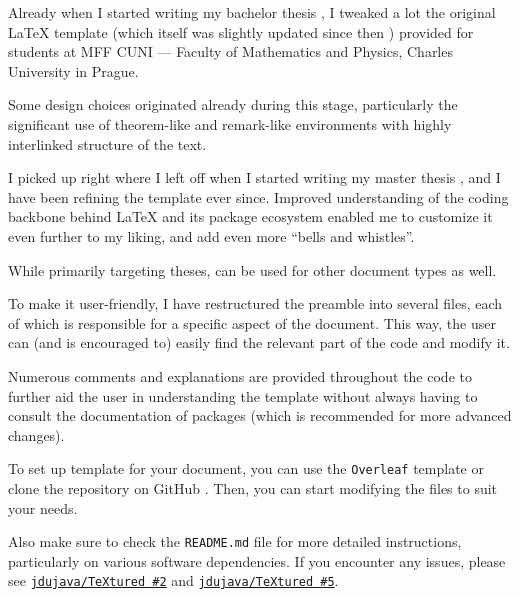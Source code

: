  \label{ch:Introduction}

Already when I started writing my bachelor thesis \autocite{Dujava2022}, I tweaked a lot the original \LaTeX{} template (which itself was slightly updated since then \autocite{MaresTemplate}) provided for students at MFF CUNI --- Faculty of Mathematics and Physics, Charles University in Prague.

Some design choices originated already during this stage, particularly the significant use of theorem-like and remark-like environments with highly interlinked structure of the text.

I picked up right where I left off when I started writing my master thesis \autocite{Dujava2025}, and I have been refining the template ever since.
Improved understanding of the coding backbone behind \LaTeX{} and its package ecosystem enabled me to customize it even further to my liking, and add even more \enquote{bells and whistles}.

\begin{remark}
    While primarily targeting theses, \TeXtured{} can be used for other document types as well.
\end{remark}

To make it user-friendly, I have restructured the preamble into several files, each of which is responsible for a specific aspect of the document.
This way, the user can (and is encouraged to) easily find the relevant part of the code and modify it.

Numerous comments and explanations are provided throughout the code to further aid the user in understanding the template without always having to consult the documentation of packages (which is recommended for more advanced changes).

\begin{remark}
    To set up \TeXtured{} template for your document, you can use the \texttt{Overleaf} template or clone the repository on \textsf{GitHub} \autocite{TeXtured}.
    Then, you can start modifying the files to suit your needs.

    Also make sure to check the \texttt{README.md} file for more detailed instructions, particularly on various software dependencies.
    If you encounter any issues, please see \href{https://github.com/jdujava/TeXtured/issues/2}{\texttt{jdujava/TeXtured \#2}} and \href{https://github.com/jdujava/TeXtured/issues/5}{\texttt{jdujava/TeXtured \#5}}.
\end{remark}
